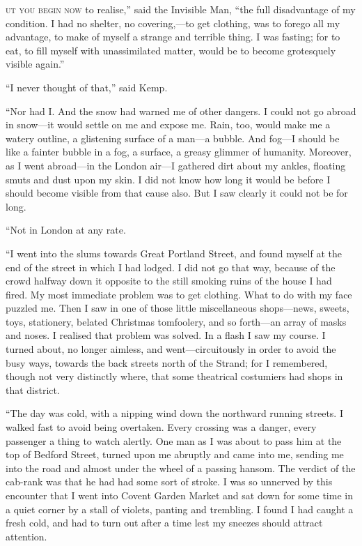 \label{ch:23}
\begin{ChapterStart}
\vspace*{2\nbs}

\vspace{1.5\nbs}
\end{ChapterStart}

\kern-5pt\textsc{ut you begin now} to realise,” said the Invisible Man, “the full disadvantage of my condition. I had no shelter, no covering,—to get clothing, was to forego all my advantage, to make of myself a strange and terrible thing. I was fasting; for to eat, to fill myself with unassimilated matter, would be to become grotesquely visible again.”

“I never thought of that,” said Kemp.

“Nor had I. And the snow had warned me of other dangers. I could not go abroad in snow—it would settle on me and expose me. Rain, too, would make me a watery outline, a glistening surface of a man—a bubble. And fog—I should be like a fainter bubble in a fog, a surface, a greasy glimmer of humanity. Moreover, as I went abroad—in the London air—I gathered dirt about my ankles, floating smuts and dust upon my skin. I did not know how long it would be before I should become visible from that cause also. But I saw clearly it could not be for long.

“Not in London at any rate.

“I went into the slums towards Great Portland Street, and found myself at the end of the street in which I had lodged. I did not go that way, because of the crowd halfway down it opposite to the still smoking ruins of the house I had fired. My most immediate problem was to get clothing. What to do with my face puzzled me. Then I saw in one of those little miscellaneous shops—news, sweets, toys, stationery, belated Christmas tomfoolery, and so forth—an array of masks and noses. I realised that problem was solved. In a flash I saw my course. I turned about, no longer aimless, and went—circuitously in order to avoid the busy ways, towards the back streets north of the Strand; for I remembered, though not very distinctly where, that some theatrical costumiers had shops in that district.

“The day was cold, with a nipping wind down the northward running streets. I walked fast to avoid being overtaken. Every crossing was a danger, every passenger a thing to watch alertly. One man as I was about to pass him at the top of Bedford Street, turned upon me abruptly and came into me, sending me into the road and almost under the wheel of a passing hansom. The verdict of the cab-rank was that he had had some sort of stroke. I was so unnerved by this encounter that I went into Covent Garden Market and sat down for some time in a quiet corner by a stall of violets, panting and trembling. I found I had caught a fresh cold, and had to turn out after a time lest my sneezes should attract attention.

